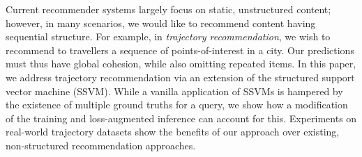 
Current recommender systems largely focus on static, unstructured content;
however, in many scenarios, we would like to recommend content having sequential structure.
For example, in \emph{trajectory recommendation}, we wish to recommend to travellers a sequence of points-of-interest in a city.
Our predictions must thus have global cohesion, while also omitting repeated items.
In this paper, we address trajectory recommendation via an extension of the structured support vector machine (SSVM).
While a vanilla application of SSVMs is hampered by the existence of multiple ground truths for a query,
we show how a modification of the training and loss-augmented inference can account for this.
Experiments on real-world trajectory datasets show the benefits of our approach over existing, non-structured recommendation approaches.




